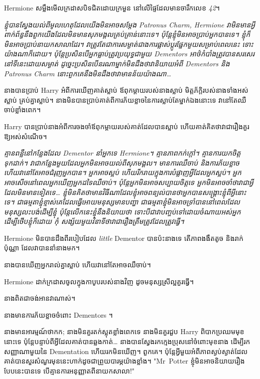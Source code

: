 {

Hermione សម្លឹងមើលក្រដាសបិទជិតដោយក្រមួន នៅលើផ្ទៃដែលមានចារឹកលេខ \emph{42}។

\emph{ខ្ញុំបានស្វែងយល់ពីមូលហេតុដែលយើងមិនអាចសម្ដែង Patronus Charm, Hermione វាមិនមានអ្វីពាក់ព័ន្ធនឹងពួកយើងដែលមិនមានសុភមង្គលគ្រប់គ្រាន់នោះទេ។ ប៉ុន្តែខ្ញុំមិនអាចប្រាប់អ្នកបានទេ។ ខ្ញុំ​ក៏​មិន​អាច​ប្រាប់​នាយក​សាលា​ដែរ។ វាត្រូវតែជាការសម្ងាត់ជាងការផ្លាស់ប្តូរផ្នែកមួយសម្រាប់ពេលនេះ ទោះយ៉ាងណាក៏ដោយ។ ប៉ុន្តែប្រសិនបើអ្នកធ្លាប់ត្រូវប្រយុទ្ធជាមួយ Dementors អាថ៌កំបាំងត្រូវបានសរសេរនៅទីនេះដោយសម្ងាត់ ដូច្នេះប្រសិនបើនរណាម្នាក់មិនដឹងថាវានិយាយអំពី Dementors និង Patronus Charm នោះពួកគេនឹងមិនដឹងថាវាមានន័យយ៉ាងណា…}

នាងបានប្រាប់ Harry អំពីការឃើញគាត់ស្លាប់ ឪពុកម្តាយរបស់នាងស្លាប់ មិត្តភ័ក្តិរបស់នាងទាំងអស់ស្លាប់ គ្រប់គ្នាស្លាប់។ នាង​មិន​បាន​ប្រាប់​គាត់​ពី​ការ​ភ័យ​ខ្លាច​នៃ​ការ​ស្លាប់​តែ​ម្នាក់​ឯង​នោះ​ទេ វា​នៅ​តែ​ឈឺ​ចាប់​ខ្លាំង​ពេក។

Harry បាន​ប្រាប់​នាង​អំពី​ការ​ចងចាំ​ឪពុក​ម្តាយ​របស់​គាត់​ដែល​បាន​ស្លាប់ ហើយ​គាត់​គិត​ថា​វា​ជា​រឿង​គួរ​ឱ្យ​អស់​សំណើច។

\emph{គ្មានពន្លឺនៅកន្លែងដែល Dementor នាំអ្នកទេ Hermione។ គ្មានភាពកក់ក្តៅ។ គ្មានការយកចិត្តទុកដាក់។ វា​ជា​កន្លែង​មួយ​ដែល​អ្នក​មិន​អាច​យល់​ពី​សុភមង្គល។ មានការឈឺចាប់ និងការភ័យខ្លាច ហើយវានៅតែអាចជំរុញអ្នកបាន។ អ្នកអាចស្អប់ ហើយរីករាយក្នុងការបំផ្លាញអ្វីដែលអ្នកស្អប់។ អ្នកអាចសើចនៅពេលអ្នកឃើញអ្នកដទៃឈឺចាប់។ ប៉ុន្តែអ្នកមិនអាចសប្បាយចិត្តទេ អ្នកមិនអាចចាំថាវាជាអ្វី ដែលមិនមានទៀតទេ… ខ្ញុំមិនគិតថាមានវិធីណាដែលខ្ញុំអាចពន្យល់បានថាអ្នកបានសង្គ្រោះខ្ញុំពីអ្វីនោះទេ។ ជាធម្មតាខ្ញុំខ្មាស់គេដែលធ្វើអោយមនុស្សមានបញ្ហា ជាធម្មតាខ្ញុំមិនអាចទ្រាំបាននៅពេលដែលមនុស្សលះបង់ដើម្បីខ្ញុំ ប៉ុន្តែលើកនេះខ្ញុំនឹងនិយាយថា ទោះបីជាវាបញ្ចប់ទៅដោយចំណាយអស់អ្នកដើម្បីថើបខ្ញុំក៏ដោយ កុំ សង្ស័យ​មួយ​វិនាទី​ថា​វា​ជា​រឿង​ត្រឹមត្រូវ​ដែល​ត្រូវ​ធ្វើ។}

Hermione មិនបានដឹងពីរបៀបដែល \emph{little} Dementor បានប៉ះនាងទេ តើភាពងងឹតតូច និងរាក់ប៉ុណ្ណា ដែលវាបាននាំនាងមក។

នាង​បាន​ឃើញ​អ្នក​រាល់​គ្នា​ស្លាប់ ហើយ​វា​នៅ​តែ​អាច​ឈឺ​ចាប់។

Hermione ដាក់​ក្រដាស​ចូល​ក្នុង​កាបូប​របស់​នាង​វិញ ដូច​មនុស្ស​ស្រី​ល្អ​គួរ​ធ្វើ។

នាងពិតជាចង់អានវាណាស់។

នាងមានការភ័យខ្លាចចំពោះ Dementors ។


នាងមានអារម្មណ៍ថាកក; នាងមិនគួរតក់ស្លុតខ្លាំងពេកទេ នាងមិនគួរជួប Harry ពិបាកប្រឈមមុខនោះទេ ប៉ុន្តែបន្ទាប់ពីអ្វីដែលគាត់បានឆ្លងកាត់… នាងបានស្វែងរកក្មេងប្រុសនៅចំពោះមុខនាង ដើម្បីរកសញ្ញាណាមួយនៃ Dementation ហើយរកមិនឃើញ។ ពួកគេ។ ប៉ុន្តែ​អ្វី​មួយ​អំពី​ភាព​ស្ងប់ស្ងាត់​ដែល​គាត់​បាន​សួរ​សំណួរ​មុន​នេះ​ហាក់​ដូច​ជា​ព្រួយ​បារម្ភ​យ៉ាង​ខ្លាំង។ "Mr~Potter ខ្ញុំមិនអាចនិយាយរឿងបែបនេះបានទេ បើគ្មានការអនុញ្ញាតពីនាយកសាលា!"

}
